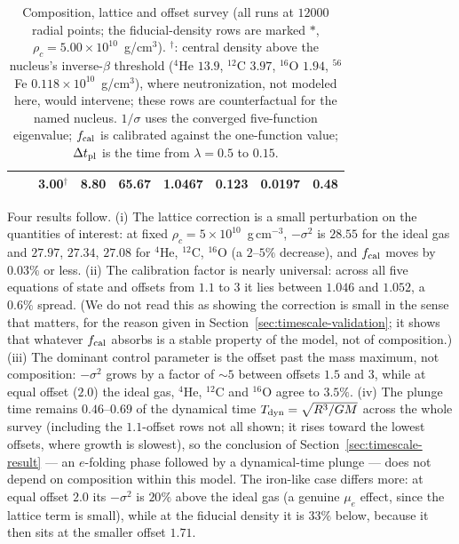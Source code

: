 \documentclass[11pt]{article}
\begin{document}
\begin{table}[h]
\begin{tabular}{lrrrrrrrr}
 &  & 3.00$^\dagger$ & 8.80 & 65.67 & 1.0467 & 0.123 & 0.0197 & 0.48 \\
\hline
\end{tabular}
\caption{Composition, lattice and offset survey (all runs at $12000$ radial points; the fiducial-density rows are marked $*$, $\rho_c=5.00\times10^{10}$~g/cm$^3$). $^\dagger$: central density above the nucleus's inverse-$\beta$ threshold \citep[Table~II]{RotondoRRX2011} ($^{4}$He $13.9$, $^{12}$C $3.97$, $^{16}$O $1.94$, $^{56}$Fe $0.118\times10^{10}$~g/cm$^3$), where neutronization, not modeled here, would intervene; these rows are counterfactual for the named nucleus. $1/\sigma$ uses the converged five-function eigenvalue; $f_{\rm cal}$ is calibrated against the one-function value; $\Delta t_{\rm pl}$ is the time from $\lambda=0.5$ to $0.15$.}
\label{tab:composition}
\end{table}

Four results follow. (i) The lattice correction is a small perturbation on the quantities of interest: at fixed $\rho_c=5\times10^{10}$~g\,cm$^{-3}$, $-\sigma^2$ is $28.55$ for the ideal gas and $27.97$, $27.34$, $27.08$ for $^{4}$He, $^{12}$C, $^{16}$O (a $2$--$5\%$ decrease), and $f_{\rm cal}$ moves by $0.03\%$ or less. (ii) The calibration factor is nearly universal: across all five equations of state and offsets from $1.1$ to $3$ it lies between $1.046$ and $1.052$, a $0.6\%$ spread. (We do not read this as showing the correction is small in the sense that matters, for the reason given in Section~\ref{sec:timescale-validation}; it shows that whatever $f_{\rm cal}$ absorbs is a stable property of the model, not of composition.) (iii) The dominant control parameter is the offset past the mass maximum, not composition: $-\sigma^2$ grows by a factor of $\sim5$ between offsets $1.5$ and $3$, while at equal offset ($2.0$) the ideal gas, $^{4}$He, $^{12}$C and $^{16}$O agree to $3.5\%$. (iv) The plunge time remains $0.46$--$0.69$ of the dynamical time $T_{\rm dyn}=\sqrt{R^3/GM}$ across the whole survey (including the $1.1$-offset rows not all shown; it rises toward the lowest offsets, where growth is slowest), so the conclusion of Section~\ref{sec:timescale-result} --- an $e$-folding phase followed by a dynamical-time plunge --- does not depend on composition within this model. The iron-like case differs more: at equal offset $2.0$ its $-\sigma^2$ is $20\%$ above the ideal gas (a genuine $\mu_e$ effect, since the lattice term is small), while at the fiducial density it is $33\%$ below, because it then sits at the smaller offset $1.71$.
\end{document}

